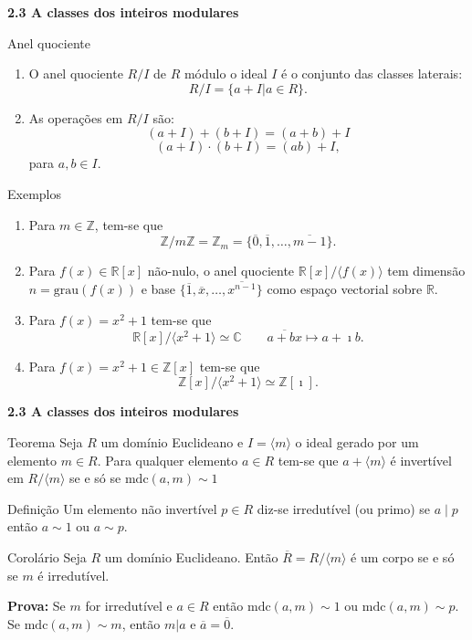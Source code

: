 \documentclass{beamer}
\newcommand{\ZZ}{\mathbb Z}
\newcommand{\CC}{\mathbb C}
\newcommand{\RR}{\mathbb R}
\newcommand{\mdc}[2]{\mathrm{mdc}({#1}, {#2})}
\begin{document}
 
\begin{frame}{\bf 2.3 A classes dos inteiros modulares}
\begin{block}{Anel quociente}
\begin{enumerate} 
\item  O anel quociente $R/I$ de $R$ módulo o ideal $I$ é o conjunto das classes laterais:
 $$R/I = \{ a+I | a\in R \}.$$\pause
\item As operações em $R/I$ são:
$$ (a+I) + (b+I) = (a+b) + I $$
$$ (a+I) \cdot (b+I) = (ab) + I,$$
para $a,b \in I$.
\end{enumerate}
\end{block}
\end{frame}


 \begin{frame}{}
 \begin{block}{Exemplos}
 \begin{enumerate}
  \item Para $m\in \ZZ$, tem-se que $$\ZZ/ m \ZZ = \ZZ_m = \{ \overline{0}, \overline{1}, \ldots, \overline{m-1}\}.$$\pause
  \item Para $f(x)\in \RR[x]$ não-nulo, o anel quociente $\RR[x]/\langle f(x) \rangle$ tem dimensão $n=\mathrm{grau}(f(x))$ e base 
  $ \{ \overline{1}, \overline{x}, \ldots, \overline{x^{n-1}}\}$  como espaço vectorial sobre $\RR$.\pause
  \item Para $f(x)=x^2+1$ tem-se que
  $$ \RR[x]/\langle x^2+1\rangle \simeq \CC \qquad \overline{a+bx} \mapsto a+\imath b.$$\pause
  \item Para $f(x)=x^2+1 \in \ZZ[x]$ tem-se que 
  $$ \ZZ[x]/\langle x^2+1\rangle \simeq \ZZ[\imath].$$
 \end{enumerate}
 \end{block}
 \end{frame}



\begin{frame}{\bf 2.3 A classes dos inteiros modulares}
\begin{block}{Teorema}
Seja $R$ um domínio Euclideano e $I=\langle m \rangle$ o ideal gerado por um elemento $m\in R$.
Para qualquer elemento $a\in R$ tem-se que 
$a+\langle m \rangle$ é invertível em $R/\langle m \rangle$ se e só se $\mdc{a}{m} \sim 1$
\end{block}
\end{frame}


 \begin{frame}{}
 \begin{block}{Definição}
Um elemento não invertível $p\in R$ diz-se irredutível (ou primo) se $a\mid p$ então $a\sim 1$ ou $a\sim p$.
 \end{block}\pause

 \begin{block}{Corolário}
Seja $R$ um domínio Euclideano. Então $\overline{R}=R/\langle m \rangle$ é um corpo se e só se $m$ é irredutível.
 \end{block}\pause
 
\medskip
{\bf Prova:}
Se $m$ for irredutível e $a\in R$ então $\mdc{a}{m} \sim 1$ ou $\mdc{a}{m} \sim p$. 
Se $\mdc{a}{m}\sim m$, então $m|a$ e $\overline{a} = \overline{0}$.

 \end{frame}
\end{document}
